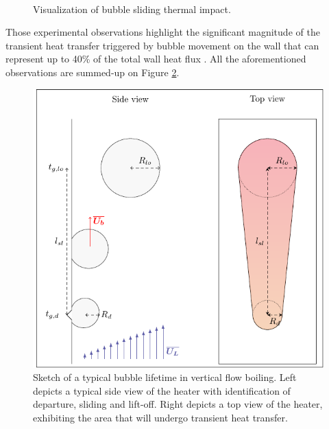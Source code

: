 \begin{figure}[H]

\begin{center}
\\
\end{center}

\caption{Visualization of bubble sliding thermal impact.}
\label{fig:slide_thermal_exp}
\end{figure}


Those experimental observations highlight the significant magnitude of the transient heat transfer triggered by bubble movement on the wall that can represent up to 40\% of the total wall heat flux \cite{kossolapov_experimental_2021}. All the aforementioned observations are summed-up on Figure \ref{fig:sketch_bub_VFB}. 

\begin{figure}[h!]
\centering
\includegraphics[width=0.65\linewidth]{img/bub_dyn/bub_life_VFB.pdf}
\caption{Sketch of a typical bubble lifetime in vertical flow boiling. Left depicts a typical side view of the heater with identification of departure, sliding and lift-off. Right depicts a top view of the heater, exhibiting the area that will undergo transient heat transfer.}
\label{fig:sketch_bub_VFB}
\end{figure}

